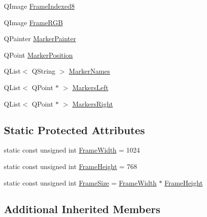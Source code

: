 \begin{DoxyCompactItemize}
\begin{tabbing}
\end{tabbing}\item 
Q\+Image \hyperlink{classmts_micron_tracker_controller_qt_component_a5a49408aaca6767730195a7f6e6ee859}{Frame\+Indexed8}
\item 
Q\+Image \hyperlink{classmts_micron_tracker_controller_qt_component_a2bcd03bf9c1a7a3ce4f6339bd4f8928e}{Frame\+R\+G\+B}
\item 
Q\+Painter \hyperlink{classmts_micron_tracker_controller_qt_component_ac80c41545a6b9c5a633fef5f6c5b8c9b}{Marker\+Painter}
\item 
Q\+Point \hyperlink{classmts_micron_tracker_controller_qt_component_a841a943c376a4f657a680c3c1ebeef40}{Marker\+Position}
\item 
Q\+List$<$ Q\+String $>$ \hyperlink{classmts_micron_tracker_controller_qt_component_a9c2fe3fd9ddc39de26a8a0047571cf5d}{Marker\+Names}
\item 
Q\+List$<$ Q\+Point $\ast$ $>$ \hyperlink{classmts_micron_tracker_controller_qt_component_a933dd8ff3d631665e825a30bf9ad8140}{Markers\+Left}
\item 
Q\+List$<$ Q\+Point $\ast$ $>$ \hyperlink{classmts_micron_tracker_controller_qt_component_ac2481b44f1f9f09fc9ea04b9d996279a}{Markers\+Right}
\end{DoxyCompactItemize}
\subsection*{Static Protected Attributes}
\begin{DoxyCompactItemize}
\item 
static const unsigned int \hyperlink{classmts_micron_tracker_controller_qt_component_a21d605763b597bc0aac16ccd81da7efe}{Frame\+Width} = 1024
\item 
static const unsigned int \hyperlink{classmts_micron_tracker_controller_qt_component_a42e61d9abf3d47a2429dd76448ff6fae}{Frame\+Height} = 768
\item 
static const unsigned int \hyperlink{classmts_micron_tracker_controller_qt_component_aef12d46a73222fb1ab376af7f0c71abb}{Frame\+Size} = \hyperlink{classmts_micron_tracker_controller_qt_component_a21d605763b597bc0aac16ccd81da7efe}{Frame\+Width} $\ast$ \hyperlink{classmts_micron_tracker_controller_qt_component_a42e61d9abf3d47a2429dd76448ff6fae}{Frame\+Height}
\end{DoxyCompactItemize}
\subsection*{Additional Inherited Members}


